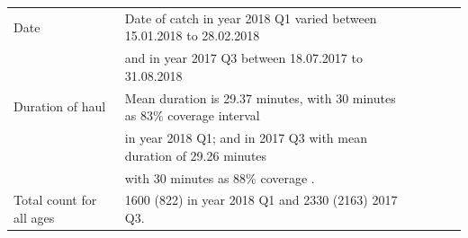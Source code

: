 \documentclass[a4paper 12pt]{article}
\numberwithin{equation}{section}
\begin{document}
{\begin{small}
\begin{table}[h!]
\begin{tabular}{llllll}
Date&Date of catch in year 2018 Q1 varied between 15.01.2018 to 28.02.2018 \\ & and in year 2017 Q3 between 18.07.2017 to 31.08.2018 \\[1.7ex]

Duration of haul & Mean duration is 29.37 minutes, with 30 minutes as 83\% coverage interval \\ & in year 2018 Q1; and in 2017 Q3 with mean duration of 29.26 minutes \\ & with 30 minutes as 88\% coverage . \\[1.0ex]

Total count for all ages & 1600 (822) in year 2018 Q1 and 2330 (2163) 2017 Q3. \\[0.5ex]
\bottomrule
\end{tabular}
\label{tab:data2018}
\end{table}
\end{small}


}
\end{document}
